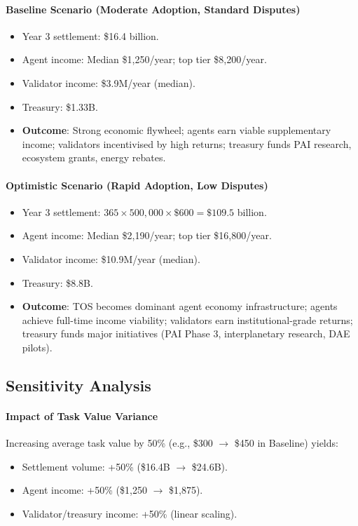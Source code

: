 \documentclass[11pt]{article}
\begin{document}
\paragraph{Baseline Scenario (Moderate Adoption, Standard Disputes)}
\begin{itemize}[noitemsep]
  \item Year 3 settlement: \$16.4 billion.
  \item Agent income: Median \$1{,}250/year; top tier \$8{,}200/year.
  \item Validator income: \$3.9M/year (median).
  \item Treasury: \$1.33B.
  \item \textbf{Outcome}: Strong economic flywheel; agents earn viable supplementary income; validators incentivised by high returns; treasury funds PAI research, ecosystem grants, energy rebates.
\end{itemize}

\paragraph{Optimistic Scenario (Rapid Adoption, Low Disputes)}
\begin{itemize}[noitemsep]
  \item Year 3 settlement: $365 \times 500{,}000 \times \$600 = \$109.5$ billion.
  \item Agent income: Median \$2{,}190/year; top tier \$16{,}800/year.
  \item Validator income: \$10.9M/year (median).
  \item Treasury: \$8.8B.
  \item \textbf{Outcome}: TOS becomes dominant agent economy infrastructure; agents achieve full-time income viability; validators earn institutional-grade returns; treasury funds major initiatives (PAI Phase 3, interplanetary research, DAE pilots).
\end{itemize}

\subsection{Sensitivity Analysis}
\paragraph{Impact of Task Value Variance}
Increasing average task value by 50\% (e.g., \$300 $\to$ \$450 in Baseline) yields:
\begin{itemize}[noitemsep]
  \item Settlement volume: +50\% (\$16.4B $\to$ \$24.6B).
  \item Agent income: +50\% (\$1{,}250 $\to$ \$1{,}875).
  \item Validator/treasury income: +50\% (linear scaling).
\end{itemize}
\end{document}
